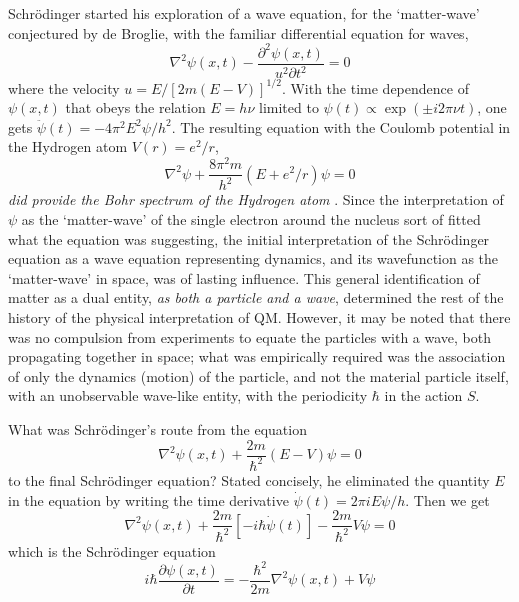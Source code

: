 Schr\"{o}dinger started his exploration of a wave equation, for the `matter-wave' conjectured
by de Broglie, with the familiar differential equation for waves,
\begin{equation*}
\nabla^2 \psi (x,t) - \frac{\partial^2 \psi (x,t)}{u^2 \partial t^2} = 0 \tag{2}\label{c14-eq2}
\end{equation*}
where the velocity $u = E/ [2m(E - V )]^{1/2}$. With the time dependence of $\psi(x,t)$
that obeys the relation $E = h\nu$ limited to $\psi(t)  \propto  \exp (\pm i2\pi \nu t)$, one gets $\ddot{\psi} (t) = -4 \pi^2 E^2 \psi /h^2$.
The resulting equation with the Coulomb potential in the Hydrogen atom $V (r) = e^2 /r$,
\begin{equation*}
\nabla^2 \psi + \frac{8 \pi^2 m}{h^2} (E + e^2 / r) \psi = 0 \tag{3}\label{c14-eq3}
\end{equation*}
\textit{did provide the Bohr spectrum of the Hydrogen atom} \cite{chap14-key1}. Since the interpretation of $\psi$ as the
`matter-wave' of the single electron around the nucleus sort of fitted what the equation was
suggesting, the initial interpretation of the Schr\"{o}dinger equation as a wave equation 
representing dynamics, and its wavefunction as the `matter-wave' in space, was of lasting influence.
This general identification of matter as a dual entity, \textit{as both a particle and a wave}, determined the rest of the history of the physical interpretation of QM. However, it may be noted that there was no compulsion from experiments to equate the particles with a wave,
both propagating together in space; what was empirically required was the association of only the
dynamics (motion) of the particle, and not the material particle itself, with an unobservable
wave-like entity, with the periodicity $\hbar$ in the action $S$.

What was Schr\"{o}dinger's route from the equation
\begin{equation*}
\nabla^2 \psi(x,t) + \frac{2m}{\hbar^2} (E-V) \psi = 0 \tag{4}\label{c14-eq4}
\end{equation*}
to the final Schr\"{o}dinger equation? Stated concisely, he eliminated the quantity $E$ in the
equation by writing the time derivative $\dot{\psi}(t) = 2\pi i E \psi /h$. Then we get
\begin{equation*}
\nabla^2 \psi (x,t)  + \frac{2m}{\hbar^2} [-i \hbar \dot{\psi} (t)] - \frac{2m}{\hbar^2} V\psi = 0 \tag{5}\label{c14-eq5}
\end{equation*}
which is the Schr\"{o}dinger equation
\begin{equation*}
i \hbar \frac{\partial \psi (x,t)}{\partial t} = - \frac{\hbar^2}{2m} \nabla^2 \psi (x,t) + V \psi  \tag{6}\label{c14-eq6}
\end{equation*}

